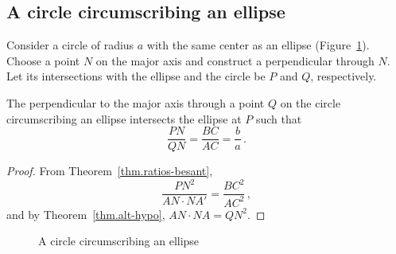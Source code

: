 
\subsection{A circle circumscribing an ellipse}

Consider a circle of radius $a$ with the same center as an ellipse (Figure~\ref{f.ellipse-circle-besant}). Choose a point $N$ on the major axis and construct a perpendicular through $N$. Let its intersections with the ellipse and the circle be $P$ and $Q$, respectively.
\begin{theorem}\label{thm.ellipse-b-over-a-besant}
The perpendicular to the major axis through a point $Q$ on the circle circumscribing an ellipse intersects the ellipse at $P$ such that
\[
\frac{PN}{QN}=\frac{BC}{AC}=\frac{b}{a}\,.
\]
\end{theorem}
\begin{proof} 
From Theorem~\ref{thm.ratios-besant},
\[
\frac{PN^2}{AN\cdot NA'} = \frac{BC^2}{AC^2}\,,
\]
and by Theorem~\ref{thm.alt-hypo}, $AN\cdot NA=QN^2$.\hqed
\end{proof}

\begin{figure}[b]
\begin{center}
\caption{A circle circumscribing an ellipse}\label{f.ellipse-circle-besant}
\end{center}
\end{figure}

